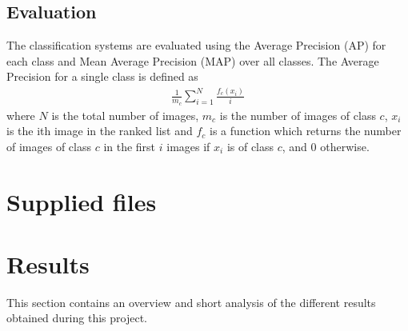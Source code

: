 \documentclass{article} %
\begin{document}
\subsection{Evaluation}
The classification systems are evaluated using the Average Precision (AP) for each class and Mean Average Precision (MAP) over all classes. The Average Precision for a single class is defined as
\begin{align}
\frac{1}{m_c} \sum\limits_{i=1}^N\frac{f_c(x_i)}{i}
\end{align}
where $N$ is the total number of images, $m_c$ is the number of images of class $c$, $x_i$ is the ith image in the ranked list and $f_c$ is a function which returns the number of images of class $c$ in the first $i$ images if $x_i$ is of class $c$, and 0 otherwise.
\newpage
\section{Supplied files}


\section{Results}
This section contains an overview and short analysis of the different results obtained during this project. \\

\end{document}
